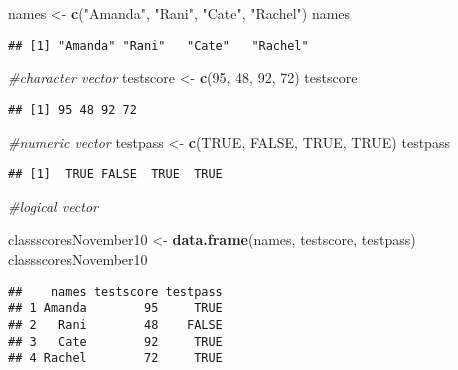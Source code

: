 \documentclass[]{article}
\newenvironment{Shaded}{\begin{snugshade}}{\end{snugshade}}
\newcommand{\CommentTok}[1]{\textcolor[rgb]{0.56,0.35,0.01}{\textit{#1}}}
\newcommand{\DecValTok}[1]{\textcolor[rgb]{0.00,0.00,0.81}{#1}}
\newcommand{\KeywordTok}[1]{\textcolor[rgb]{0.13,0.29,0.53}{\textbf{#1}}}
\newcommand{\NormalTok}[1]{#1}
\newcommand{\OtherTok}[1]{\textcolor[rgb]{0.56,0.35,0.01}{#1}}
\newcommand{\StringTok}[1]{\textcolor[rgb]{0.31,0.60,0.02}{#1}}
\begin{document}
\begin{Shaded}
\begin{Highlighting}[]
\NormalTok{names <-}\StringTok{ }\KeywordTok{c}\NormalTok{(}\StringTok{"Amanda"}\NormalTok{, }\StringTok{"Rani"}\NormalTok{, }\StringTok{"Cate"}\NormalTok{, }\StringTok{"Rachel"}\NormalTok{) }
\NormalTok{names}
\end{Highlighting}
\end{Shaded}

\begin{verbatim}
## [1] "Amanda" "Rani"   "Cate"   "Rachel"
\end{verbatim}

\begin{Shaded}
\begin{Highlighting}[]
\CommentTok{#character vector }
\NormalTok{testscore <-}\StringTok{ }\KeywordTok{c}\NormalTok{(}\DecValTok{95}\NormalTok{, }\DecValTok{48}\NormalTok{, }\DecValTok{92}\NormalTok{, }\DecValTok{72}\NormalTok{)}
\NormalTok{testscore}
\end{Highlighting}
\end{Shaded}

\begin{verbatim}
## [1] 95 48 92 72
\end{verbatim}

\begin{Shaded}
\begin{Highlighting}[]
\CommentTok{#numeric vector }
\NormalTok{testpass <-}\StringTok{ }\KeywordTok{c}\NormalTok{(}\OtherTok{TRUE}\NormalTok{, }\OtherTok{FALSE}\NormalTok{, }\OtherTok{TRUE}\NormalTok{, }\OtherTok{TRUE}\NormalTok{)}
\NormalTok{testpass}
\end{Highlighting}
\end{Shaded}

\begin{verbatim}
## [1]  TRUE FALSE  TRUE  TRUE
\end{verbatim}

\begin{Shaded}
\begin{Highlighting}[]
\CommentTok{#logical vector }

\NormalTok{classscoresNovember10 <-}\StringTok{ }\KeywordTok{data.frame}\NormalTok{(names, testscore, testpass)}
\NormalTok{classscoresNovember10}
\end{Highlighting}
\end{Shaded}

\begin{verbatim}
##    names testscore testpass
## 1 Amanda        95     TRUE
## 2   Rani        48    FALSE
## 3   Cate        92     TRUE
## 4 Rachel        72     TRUE
\end{verbatim}
\end{document}

